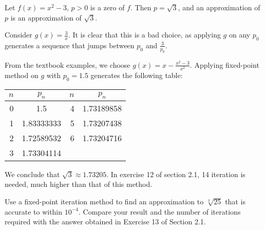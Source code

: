 \documentclass[../../../../Assignments]{subfiles}
\begin{document}
\begin{solution}
    Let \(f(x) = x^2 - 3\), \(p > 0\) is a zero of \(f\). Then \(p = \sqrt{3}\),
    and an approximation of \(p\) is an approximation of \(\sqrt{3}\).

    Consider \(g(x) = \frac{3}{x}\). It is clear that this is a bad choice, as
    applying \(g\) on any \(p_0\) generates a sequence that jumps between
    \(p_0\) and \(\frac{3}{p_0}\).

    From the textbook examples, we choose \(g(x) = x - \frac{x^2 - 3}{x^2}\).
    Applying fixed-point method on \(g\) with \(p_0 = \num{1.5}\) generates the
    following table:

    \begin{table}[H]
        \centering
        \begin{tabular}{r S[table-format=1.8] r S[table-format=1.8]}
            \toprule
            \(n\)  &   {\(p_n\)}   &  \(n\)  &   {\(p_n\)}   \\
              &  1.5          &      4  &  1.73189858   \\
                1  &  1.83333333   &      5  &  1.73207438   \\
                2  &  1.72589532   &      6  &  1.73204716   \\
                3  &  1.73304114   &         &               \\
            \bottomrule
        \end{tabular}
    \end{table}

    We conclude that \(\sqrt{3} \approx \num{1.73205}\). In exercise 12 of
    section 2.1, 14 iteration is needed, much higher than that of this method.
\end{solution}

\begin{exercise}
    Use a fixed-point iteration method to find an approximation to
    \(\sqrt[3]{25}\) that is accurate to within \(10^{-4}\). Compare your result
    and the number of iterations required with the answer obtained in Exercise
    13 of Section 2.1.
\end{exercise}
\end{document}
